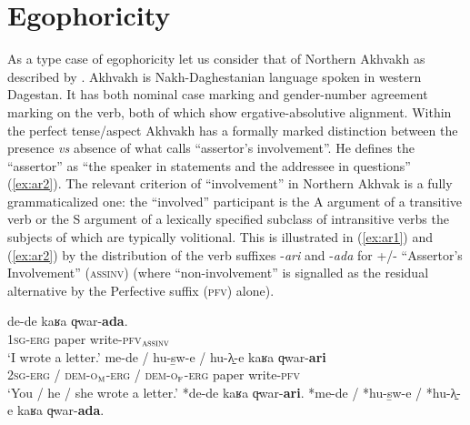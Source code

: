\documentclass[output=paper]{langsci/langscibook}
\begin{document}
\section{Egophoricity}\label{s:ar2}

As a type case of egophoricity let us consider that of Northern Akhvakh as described by \cite{Creissels2008}.   Akhvakh is Nakh-Daghestanian language spoken in western Dagestan. It has both nominal case marking and gender-number agreement marking on the verb, both of which show ergative-absolutive alignment. Within the perfect tense/aspect Akhvakh has a formally marked distinction between the presence \textit{vs} absence of what \citeauthor{Creissels2008} calls “assertor’s involvement”. He defines the “assertor” as “the speaker in statements and the addressee in questions” (\ref{ex:ar2}). The relevant criterion of “involvement” in Northern Akhvak is a fully grammaticalized one: the “involved” participant is the A argument of a transitive verb or the S argument of a lexically specified subclass of intransitive verbs the subjects of which are typically volitional. This is illustrated in (\ref{ex:ar1}) and (\ref{ex:ar2}) by the distribution of the verb suffixes -\textit{ari} and  -\textit{ada} for +/- “Assertor’s Involvement” (\textsc{assinv})  (where “non-involvement” is signalled as the residual alternative by the Perfective suffix (\textsc{pfv}) alone).

\begin{exe}
	\ex 	\label{ex:ar1}
	\begin{xlist}
		\ex \label{ex:ar1a}
		\gll de-de kaʁa q̵war-\textbf{ada}.\\
		1\textsc{sg}-\textsc{erg} paper	write-\textsc{pfv}$_{\textsc{assinv}}$\\
		\trans ‘I wrote a letter.’
		\ex \label{ex:ar1b}
		\gll me-de / hu-s̱w-e / hu-λ̱-e kaʁa q̵war-\textbf{ari}\\
		2\textsc{sg}-\textsc{erg} / \textsc{dem}-\textsc{o}$_\textsc{m}$-\textsc{erg} / \textsc{dem}-\textsc{o}$_\textsc{f}$-\textsc{erg} paper	write-\textsc{pfv}\\
		\trans ‘You / he / she wrote a letter.’
		\ex \label{ex:ar1c} *de-de kaʁa q̵war-\textbf{ari}.
		\ex \label{ex:ar1d} *me-de / *hu-s̱w-e / *hu-λ̱-e kaʁa q̵war-\textbf{ada}.\\ \cite[1]{Creissels2008}
	\end{xlist}
\end{exe}
\end{document}

